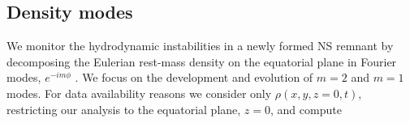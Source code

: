 


\subsection{Density modes} \label{sec:bns_sims:method:modes}


We monitor the hydrodynamic instabilities in a newly formed \ac{NS} remnant 
by decomposing 
the Eulerian rest-mass density on the equatorial plane 
in Fourier modes,
$e^{- i m \phi}$  
\citep[see Eq.~(1) in][]{Radice:2016gym}.
We focus on the development and evolution of $m=2$ and $m=1$ modes. 
%
%
%
%
For data availability reasons we consider only $\rho(x,y,z=0,t)$, 
\ie{} restricting our analysis to the equatorial plane, $z=0$, and compute 

